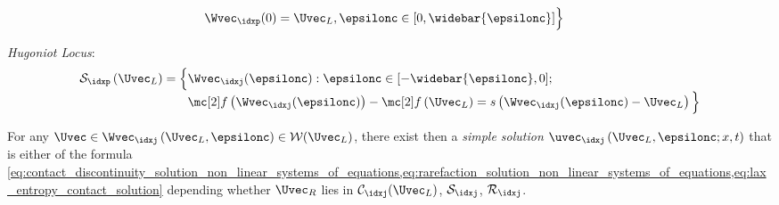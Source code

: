 \begin{sectionbox}
\begin{itemizenosep}
\begin{align*}
         &\Wvec_{\idxp}(0)=\Uvec_{L}, \epsilonc\in[0,\widebar{\epsilonc}]
         \Big\}
       \end{align*}
       \item \textit{Hugoniot Locus}:
       \begin{align*}
         \mathcal{S}_{\idxp}\left(\Uvec_{L}\right)=\Big\{&\Wvec_{\idxj}(\epsilonc):\epsilonc\in[-\widebar{\epsilonc},0];\\[-1\jot]
                                                         &\flux\left(\Wvec_{\idxj}(\epsilonc)\right)-\flux\left(\Uvec_{L}\right)=s \left(\Wvec_{\idxj}(\epsilonc)-\Uvec_{L}\right)\Big\}
       \end{align*}
   \end{itemizenosep}
   For any $\Uvec\in\Wvec_{\idxj}\left(\Uvec_{L},\epsilonc\right)\in\mathcal{W}(\Uvec_{L})$, there exist then a \textit{simple solution} $\uvec_{\idxj}\left(\Uvec_{L},\epsilonc;x,t\right)$ that is
   either of the formula \cref{eq:contact_discontinuity_solution_non_linear_systems_of_equations,eq:rarefaction_solution_non_linear_systems_of_equations,eq:lax_entropy_contact_solution} depending whether $\Uvec_{R}$ lies in
   $\mathcal{C}_{\idxj}(\Uvec_{L})$, $\mathcal{S}_{\idxj}$, $\mathcal{R}_{\idxj}$.
\end{sectionbox}
